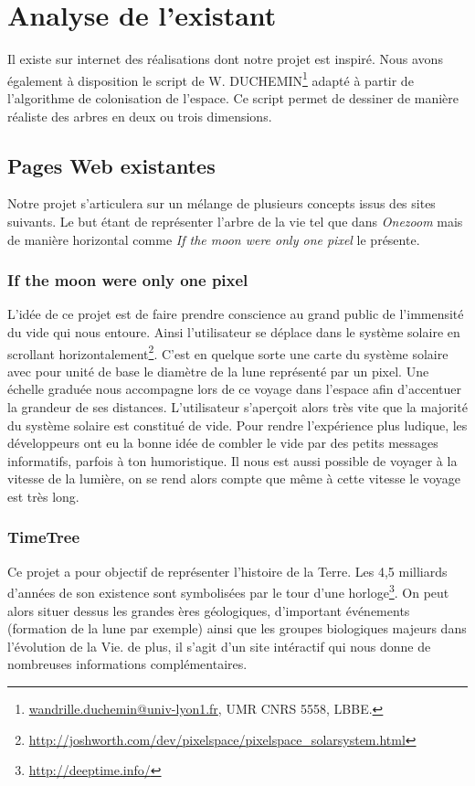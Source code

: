 \documentclass[a4paper]{article}
\begin{document}
\section{Analyse de l'existant}
	Il existe sur internet des réalisations dont notre projet est inspiré. Nous avons également à disposition le script de W. DUCHEMIN\footnote{\url{wandrille.duchemin@univ-lyon1.fr}, UMR CNRS 5558, LBBE.} adapté à partir de l'algorithme de colonisation de l'espace. Ce script permet de dessiner de manière réaliste des arbres en deux ou trois dimensions.

	\subsection{Pages Web existantes}
		Notre projet s'articulera sur un mélange de plusieurs concepts issus des sites suivants. Le but étant de représenter l'arbre de la vie tel que dans \emph{Onezoom} mais de manière horizontal comme \emph{If the moon were only one pixel} le présente.

		\subsubsection{If the moon were only one pixel}
			L’idée de ce projet est de faire prendre conscience au grand public de l'immensité du vide qui nous entoure. Ainsi l'utilisateur se déplace dans le système solaire en scrollant horizontalement\footnote{\url{http://joshworth.com/dev/pixelspace/pixelspace_solarsystem.html}}. C'est en quelque sorte une carte du système solaire avec pour unité de base le diamètre de la lune représenté par un pixel. Une échelle graduée nous accompagne lors de ce voyage dans l'espace afin d'accentuer la grandeur de ses distances. L'utilisateur s’aperçoit alors très vite que la majorité du système solaire est constitué de vide. Pour rendre l'expérience plus ludique, les développeurs ont eu la bonne idée de combler le vide par des petits messages informatifs, parfois à ton humoristique. Il nous est aussi possible de voyager à la vitesse de la lumière, on se rend alors compte que même à cette vitesse le voyage est très long.         
 		
		\subsubsection{TimeTree}
			Ce projet a pour objectif de représenter l'histoire de la Terre. Les 4,5 milliards d'années de son existence sont symbolisées par le tour d'une horloge\footnote{\url{http://deeptime.info/}}. On peut alors situer dessus les grandes ères géologiques, d'important événements (formation de la lune par exemple) ainsi que les groupes biologiques majeurs dans l'évolution de la Vie. de plus, il s'agit d'un site intéractif qui nous donne de nombreuses informations complémentaires.
	
\end{document}
